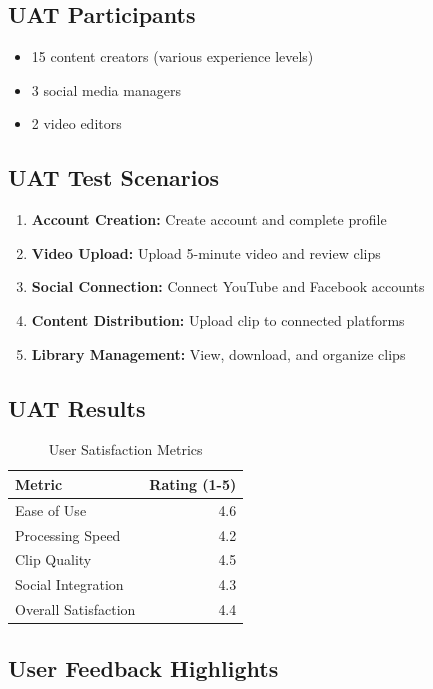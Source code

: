 \subsection{UAT Participants}

\begin{itemize}
    \item 15 content creators (various experience levels)
    \item 3 social media managers
    \item 2 video editors
\end{itemize}

\subsection{UAT Test Scenarios}

\begin{enumerate}
    \item \textbf{Account Creation:} Create account and complete profile
    \item \textbf{Video Upload:} Upload 5-minute video and review clips
    \item \textbf{Social Connection:} Connect YouTube and Facebook accounts
    \item \textbf{Content Distribution:} Upload clip to connected platforms
    \item \textbf{Library Management:} View, download, and organize clips
\end{enumerate}

\subsection{UAT Results}

\begin{table}[H]
\centering
\caption{User Satisfaction Metrics}
\begin{tabular}{@{}lr@{}}
\toprule
\textbf{Metric} & \textbf{Rating (1-5)} \\
\midrule
Ease of Use & 4.6 \\
Processing Speed & 4.2 \\
Clip Quality & 4.5 \\
Social Integration & 4.3 \\
Overall Satisfaction & 4.4 \\
\bottomrule
\end{tabular}
\end{table}

\subsection{User Feedback Highlights}

